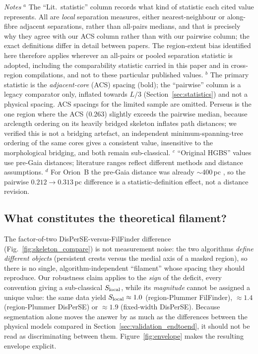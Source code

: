 \documentclass[usenatbib,twoside,twocolumn]{mnras}
\begin{document}
\begin{table}
\vspace{0.1in}
\footnotesize
\emph{Notes} $^{a}$ The ``Lit.\ statistic'' column records what kind of statistic each cited value represents. All are \emph{local} separation measures, either nearest-neighbour or along-fibre adjacent separations, rather than all-pairs medians, and that is precisely why they agree with our ACS column rather than with our pairwise column; the exact definitions differ in detail between papers. The region-extent bias identified here therefore applies wherever an all-pairs or pooled separation statistic is adopted, including the comparability statistic carried in this paper and in cross-region compilations, and not to these particular published values. $^{b}$ The primary statistic is the \emph{adjacent-core} (ACS) spacing (bold); the ``pairwise'' column is a legacy comparator only, inflated towards $L/3$ (Section~\ref{sec:statistics}) and not a physical spacing. ACS spacings for the limited sample are omitted. Perseus is the one region where the ACS ($0.263$) slightly exceeds the pairwise median, because arclength ordering on its heavily bridged skeleton inflates path distances; we verified this is not a bridging artefact, an independent minimum-spanning-tree ordering of the same cores gives a consistent value, insensitive to the morphological bridging, and both remain sub-classical. $^{c}$ ``Original HGBS'' values use pre-Gaia distances; literature ranges reflect different methods and distance assumptions. $^{d}$ For Orion~B the pre-Gaia distance was already $\sim$400\,pc \citep{Konyves2020}, so the pairwise $0.212\to0.313$\,pc difference is a statistic-definition effect, not a distance revision.
\end{table}

\subsection{What constitutes the theoretical filament?}
\label{sec:whatfilament}

The factor-of-two DisPerSE-versus-FilFinder difference (Fig.~\ref{fig:skeleton_compare}) is not measurement noise: the two algorithms \emph{define different objects} (persistent crests versus the medial axis of a masked region), so there is no single, algorithm-independent ``filament'' whose spacing they should reproduce. Our robustness claim applies to the \emph{sign} of the deficit, every convention giving a sub-classical $S_{\rm local}$, while its \emph{magnitude} cannot be assigned a unique value: the same data yield $S_{\rm local}\approx1.0$ (region-Plummer FilFinder), $\approx1.4$ (region-Plummer DisPerSE) or $\approx1.9$ (fixed-width DisPerSE). Because segmentation alone moves the answer by as much as the differences between the physical models compared in Section~\ref{sec:validation_endtoend}, it should not be read as discriminating between them. Figure~\ref{fig:envelope} makes the resulting envelope explicit.
\end{document}
